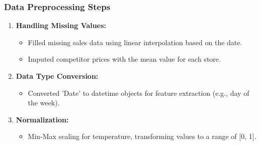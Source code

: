 \documentclass[aspectratio=169]{beamer}
\begin{document}
\begin{frame}[fragile]
    \frametitle{Data Preprocessing Steps}
    \begin{enumerate}
        \item \textbf{Handling Missing Values:}
        \begin{itemize}
            \item Filled missing sales data using linear interpolation based on the date.
            \item Imputed competitor prices with the mean value for each store.
        \end{itemize}
        
        \item \textbf{Data Type Conversion:}
        \begin{itemize}
            \item Converted 'Date' to datetime objects for feature extraction (e.g., day of the week).
        \end{itemize}
        
        \item \textbf{Normalization:}
        \begin{itemize}
            \item Min-Max scaling for temperature, transforming values to a range of [0, 1].
        \end{itemize}
    \end{enumerate}
\end{frame}
\end{document}
